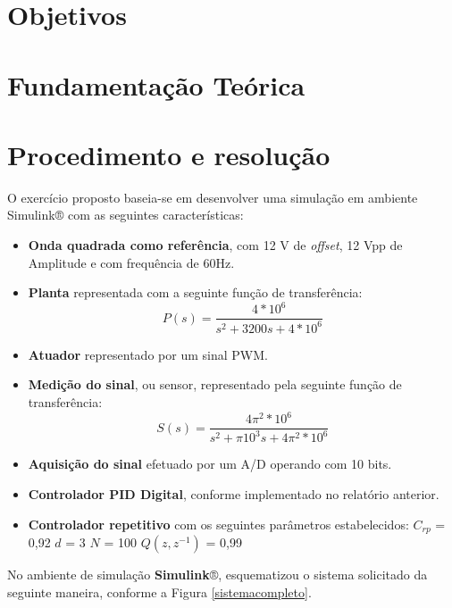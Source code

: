 
\section{Objetivos}

\section{Fundamentação Teórica}

\section{Procedimento e resolução}

	O exercício proposto baseia-se em desenvolver uma simulação em ambiente Simulink® com as seguintes características:
	
	\begin{itemize}
		\item \textbf{Onda quadrada como referência}, com 12 V de \textit{offset}, 12 Vpp de Amplitude e com frequência de 60Hz.
		\item \textbf{Planta} representada com a seguinte função de transferência: \begin{equation}
			P(s) = \frac{4*10^6}{s^2+3200s+4*10^6}
		\end{equation}
		\item \textbf{Atuador} representado por um sinal PWM.
		\item \textbf{Medição do sinal}, ou sensor, representado pela seguinte função de transferência: \begin{equation}
			S(s) = \frac{4\pi{^2}*10^6}{s^2+\pi{10^3}s+4\pi{^2}*10^6}
		\end{equation}
		\item \textbf{Aquisição do sinal} efetuado por um A/D operando com 10 bits.
		\item \textbf{Controlador PID Digital}, conforme implementado no relatório anterior.
		\item \textbf{Controlador repetitivo} com os seguintes parâmetros estabelecidos:
		\subitem $C_{rp}$ = 0,92
		\subitem $d$ = 3
		\subitem $N$ = 100
		\subitem $Q(z,z^{-1})$ = 0,99
	\end{itemize}
	
	No ambiente de simulação \textbf{Simulink}®, esquematizou o sistema solicitado da seguinte maneira, conforme a Figura \ref{sistemacompleto}.
	
